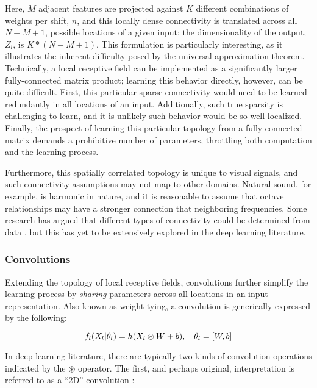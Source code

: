 \noindent Here, $M$ adjacent features are projected against $K$ different combinations of weights per shift, $n$, and this locally dense connectivity is translated across all $N-M+1$, possible locations of a given input;
the dimensionality of the output, $Z_l$, is $K*(N-M+1)$.
This formulation is particularly interesting, as it illustrates the inherent difficulty posed by the universal approximation theorem.
Technically, a local receptive field can be implemented as a significantly larger fully-connected matrix product;
learning this behavior directly, however, can be quite difficult.
First, this particular sparse connectivity would need to be learned redundantly in all locations of an input.
Additionally, such true sparsity is challenging to learn, and it is unlikely such behavior would be so well localized.
Finally, the prospect of learning this particular topology from a fully-connected matrix demands a prohibitive number of parameters, throttling both computation and the learning process.

Furthermore, this spatially correlated topology is unique to visual signals, and such connectivity assumptions may not map to other domains.
Natural sound, for example, is harmonic in nature, and it is reasonable to assume that octave relationships may have a stronger connection that neighboring frequencies.
Some research has argued that different types of connectivity could be determined from data \cite{Coates2012Learning}, but this has yet to be extensively explored in the deep learning literature.


\subsubsection{Convolutions}

Extending the topology of local receptive fields, convolutions further simplify the learning process by \emph{sharing} parameters across all locations in an input representation.
Also known as weight tying, a convolution is generically expressed by the following:

\begin{equation}
\label{eq:convlayer}
\small
f_l(X_l \vert \theta_l) = h(X_{l} \circledast W + b), \quad \theta_l = [W, b]
\end{equation}

\noindent In deep learning literature, there are typically two kinds of convolution operations indicated by the $\circledast$ operator.
The first, and perhaps original, interpretation is referred to as a ``2D'' convolution \cite{LeCun1998Gradient}:

